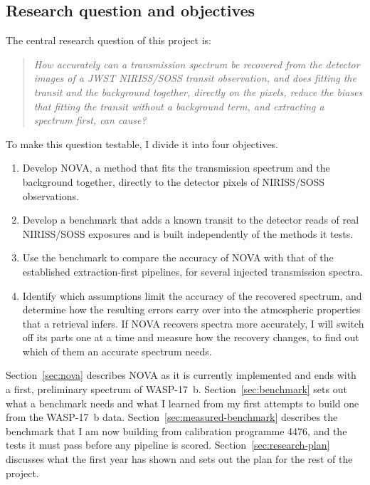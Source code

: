 \subsection{Research question and objectives}
\label{sec:research-question}

The central research question of this project is:
\begin{quote}
\raggedright\itshape
How accurately can a transmission spectrum be recovered from the detector
images of a JWST NIRISS/SOSS transit observation, and does fitting the
transit and the background together, directly on the pixels, reduce the
biases that fitting the transit without a background term, and extracting a spectrum first, can cause?
\end{quote}

To make this question testable, I divide it into four objectives.
\begin{enumerate}[label=\arabic*.,leftmargin=1.5em]
  \item Develop NOVA, a method that fits the transmission spectrum and the
  background together, directly to the detector pixels of NIRISS/SOSS
  observations.
  \item Develop a benchmark that adds a known transit to the detector reads of
  real NIRISS/SOSS exposures and is built independently of the methods it
  tests.
  \item Use the benchmark to compare the accuracy of NOVA with that of the
  established extraction-first pipelines, for several injected transmission
  spectra.
  \item Identify which assumptions limit the accuracy of the recovered
  spectrum, and determine how the resulting errors carry over into the
  atmospheric properties that a retrieval infers. If NOVA recovers spectra
  more accurately, I will switch off its parts one at a time and measure how
  the recovery changes, to find out which of them an accurate spectrum
  needs.
\end{enumerate}

Section~\ref{sec:nova} describes NOVA as it is currently implemented and ends
with a first, preliminary spectrum of WASP-17~b. Section~\ref{sec:benchmark}
sets out what a benchmark needs and what I learned from my first attempts to
build one from the WASP-17~b data. Section~\ref{sec:measured-benchmark}
describes the benchmark that I am now building from calibration programme
4476, and the tests it must pass before any pipeline is scored.
Section~\ref{sec:research-plan} discusses what the first year has shown and
sets out the plan for the rest of the project.
